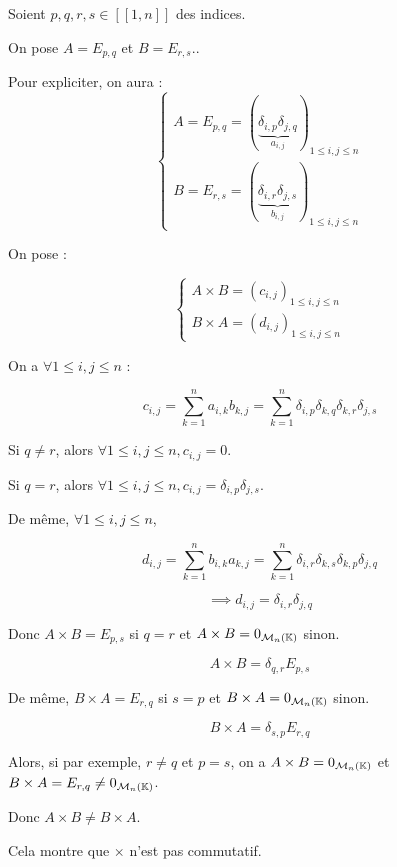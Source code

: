 \documentclass[12pt, a4paper]{report}
\begin{document}
\begin{property}
    Soient $p,q,r,s \in [\![1,n]\!]$ des indices.

    On pose $A = E_{p,q}$ et $B = E_{r,s}$..

    Pour expliciter, on aura :
    $$\begin{cases}
    A = E_{p,q} = (\underbrace{\delta_{i,p}\delta_{j,q}}_{a_{i,j}})_{1 \le i,j \le n}\\
    B = E_{r,s} = (\underbrace{\delta_{i,r}\delta_{j,s}}_{b_{i,j}})_{1 \le i,j \le n}
    \end{cases}$$

    On pose :
    
    $$\begin{cases}A\times B = (c_{i,j})_{1 \le i,j \le n}
    \\
    B\times A = (d_{i,j})_{1 \le i,j \le n}\end{cases}$$

    On a $\forall 1 \le i,j \le n$ :
    
    $$c_{i,j} = \sum_{k=1}^n a_{i,k} b_{k,j} = \sum_{k=1}^n \delta_{i,p}\delta_{k,q} \delta_{k,r}\delta_{j,s}$$
    
    Si $q \ne r$, alors $\forall 1 \le i,j \le n, c_{i,j} = 0$.

    Si $q = r$, alors $\forall 1 \le i,j \le n, c_{i,j} = \delta_{i,p}\delta_{j,s}$.

    De même, $\forall 1 \le i,j \le n$,
    
    $$d_{i,j} = \sum_{k=1}^n b_{i,k} a_{k,j} = \sum_{k=1}^n \delta_{i,r}\delta_{k,s} \delta_{k,p}\delta_{j,q}$$
    
    $$\implies \boxed{d_{i,j} = \delta_{i,r}\delta_{j,q}}$$

    Donc $A\times B = E_{p,s}$ si $q=r$ et $A\times B = 0_{\mathcal M_n(\mathbb{K})}$ sinon.

    $$A\times B = \delta_{q,r} E_{p,s}$$

    De même, $B\times A = E_{r,q}$ si $s=p$ et $B\times A = 0_{\mathcal M_n(\mathbb{K})}$ sinon.

    $$B\times A = \delta_{s,p} E_{r,q}$$

    Alors, si par exemple, $r \ne q$ et $p=s$, on a $A\times B = 0_{\mathcal M_n(\mathbb{K})}$ et $B\times A = E_{r,q} \ne 0_{\mathcal M_n(\mathbb{K})}$.

    Donc $A\times B \ne B\times A$.

    Cela montre que $\times$ n'est pas commutatif.
\end{property}
\end{document}
